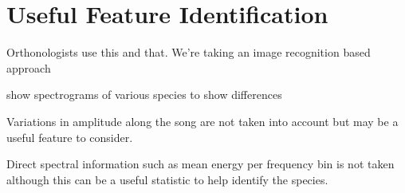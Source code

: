 \section{Useful Feature Identification}

Orthonologists use this and that.
We're taking an image recognition based approach

show spectrograms of various species to show differences

Variations in amplitude along the song are not taken into account but may be a 
useful feature to consider.

Direct spectral information such as mean energy per frequency bin is not taken
although this can be a useful statistic to help identify the species.

